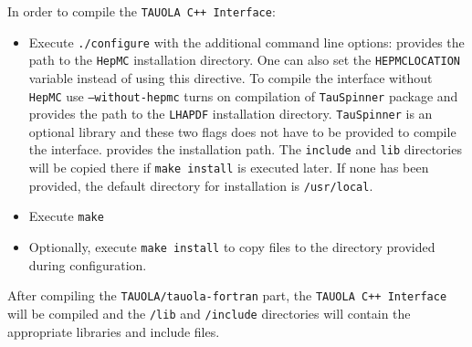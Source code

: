 \documentclass[]{Tauola_interface_design}
\begin{document}
In order to compile the {\tt TAUOLA C++ Interface}:
\begin{itemize}
 \item Execute {\tt ./configure} with the additional command line options:
    provides the path to the {\tt HepMC} installation directory. One can also set the {\tt HEPMCLOCATION} variable instead of using this directive. To compile the interface without {\tt HepMC} use {\tt --without-hepmc}
    turns on compilation of {\tt TauSpinner} package and provides the path to the {\tt LHAPDF} installation directory. {\tt TauSpinner} is an optional library and these two flags does not have to be provided to compile the interface.
    provides the installation path. The {\tt include} and {\tt lib} directories will be copied there if {\tt make install} is executed later. If none has been provided, the default directory for installation is {\tt /usr/local}.
 \item Execute {\tt make}
 \item Optionally, execute {\tt make install} to copy files to the directory provided during configuration.
\end{itemize}

After compiling the {\tt TAUOLA/tauola-fortran} part, the {\tt TAUOLA C++ Interface} will be compiled and the {\tt /lib} and {\tt /include} directories will contain the appropriate libraries and include files.
\end{document}
